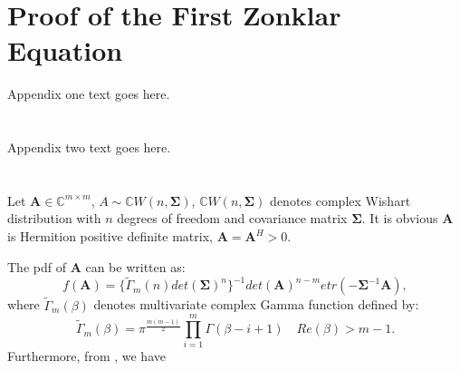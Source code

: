 \documentclass[12pt, draftclsnofoot, onecolumn]{IEEEtran}
\begin{document}
%


\appendices
\section{Proof of the First Zonklar Equation}
Appendix one text goes here.

\section{}
Appendix two text goes here.
\section{}
Let $\mathbf{A}\in \mathbb{C}^{m\times m}$, $A\sim \mathbb{C}W(n, \mathbf{\Sigma})$, $\mathbb{C}W(n, \mathbf{\Sigma})$ denotes complex Wishart distribution with $n$ degrees of freedom and covariance matrix $\mathbf{\Sigma}$. It is obvious $\mathbf{A}$ is Hermition positive definite matrix, $\mathbf{A}=\mathbf{A}^{H}>0$.

The pdf of $\mathbf{A}$ can be written as\cite{nagar2011expectations}:
\begin{equation}
f(\mathbf{A})=\{\tilde{\Gamma}_{m}(n)det(\mathbf{\Sigma})^{n} \}^{-1}det(\mathbf{A})^{n-m}etr(-\mathbf{\Sigma}^{-1}\mathbf{A}),
\label{Appendequa1}
\end{equation}
where $\tilde{\Gamma}_{m}(\beta)$ denotes multivariate complex Gamma function defined by:
\begin{equation}
\tilde{\Gamma}_{m}(\beta)=\pi^{\frac{m(m-1)}{2}}\prod_{i=1}^{m}\Gamma(\beta-i+1)\quad Re(\beta)>m-1.
\label{Appendequa2}
\end{equation}
Furthermore, from \cite{nagar2011expectations}, we have 
\end{document}
